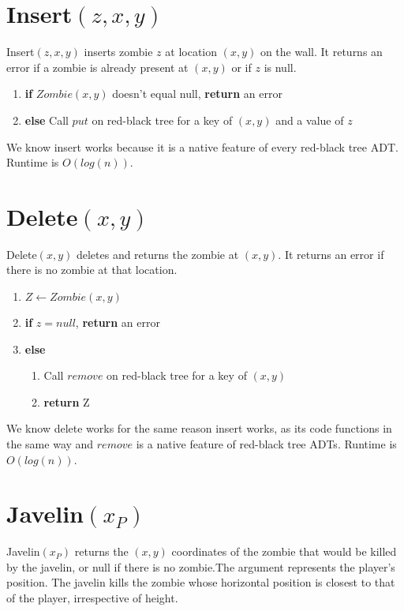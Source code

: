 \documentclass{article}
\begin{document}
\section{Insert$(z,x,y)$}
Insert$(z,x,y)$ inserts zombie $z$ at location $(x,y)$ on the wall. It returns an error if a zombie is already present at $(x,y)$ or if $z$ is null.
\begin{enumerate}
    \item \textbf{if} $Zombie(x,y)$ doesn't equal null, \textbf{return} an error
    \item \textbf{else} Call $put$ on red-black tree for a key of  $(x,y)$ and a value of $z$
\end{enumerate}
We know insert works because it is a native feature of every red-black tree ADT. Runtime is $O(log(n))$.

\section{Delete$(x,y)$}
Delete$(x,y)$  deletes  and  returns  the  zombie  at  $(x,y)$.  It  returns an error if there is no zombie at that location. 
\begin{enumerate}
    \item$ Z \leftarrow Zombie(x,y)$ 
    \item \textbf{if} $z=null$, \textbf{return} an error
    \item \textbf{else} 
    \begin{enumerate}
        \item Call $remove$ on red-black tree for a key of $(x,y)$
        \item \textbf{return} Z
    \end{enumerate}
\end{enumerate}
We know delete works for the same reason insert works, as its code functions in the same way and $remove$ is a native feature of red-black tree ADTs. Runtime is $O(log(n))$.

\section{Javelin$(x_P)$}
Javelin$(x_P)$ returns the $(x,y)$ coordinates of the zombie that would be killed by the javelin, or null if there is no zombie.The argument represents the player’s position. The javelin  kills  the  zombie  whose  horizontal  position  is  closest to that of the player, irrespective of height. 
\end{document}

